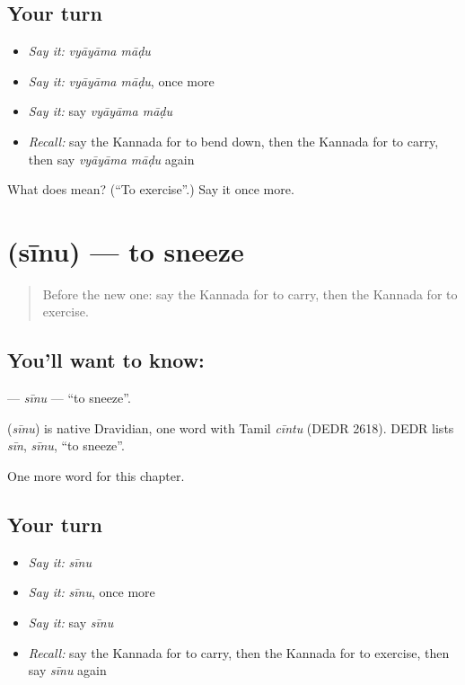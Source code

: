 \subsection*{Your turn}
\begin{itemize}
\raggedright
  \item \emph{Say it:} \emph{vyāyāma māḍu}
  \item \emph{Say it:} \emph{vyāyāma māḍu}, once more
  \item \emph{Say it:} say \emph{vyāyāma māḍu}
  \item \emph{Recall:} say the Kannada for to bend down, then the Kannada for to carry, then say \emph{vyāyāma māḍu} again
\end{itemize}

\begin{tcolorbox}[breakable,colback=teal!4,colframe=teal!35!black,title={Before you move on}]
What does   mean? (\textquotedblleft{}To exercise\textquotedblright{}.) Say it once more.
\end{tcolorbox}
\section[\texorpdfstring{\kn{ಸೀನು} (sīnu)}{ಸೀನು (sīnu)}]{ (sīnu) — to sneeze}

\label{lesson:KA-C160-sinu}



\begin{quote}
Before the new one: say the Kannada for to carry, then the Kannada for to exercise.
\end{quote}

\subsection*{You'll want to know: }
\textbf{} — \emph{sīnu} — \textquotedblleft{}to sneeze\textquotedblright{}.

\begin{cousinweb}
\textbf{} (\emph{sīnu}) is native Dravidian, one word with Tamil \emph{cīntu} (DEDR 2618). DEDR lists \emph{sīn}, \emph{sīnu}, \textquotedblleft{}to sneeze\textquotedblright{}.
\end{cousinweb}

\begin{grammarlens}[title={What you've built}]
One more word for this chapter.
\end{grammarlens}

\subsection*{Your turn}
\begin{itemize}
\raggedright
  \item \emph{Say it:} \emph{sīnu}
  \item \emph{Say it:} \emph{sīnu}, once more
  \item \emph{Say it:} say \emph{sīnu}
  \item \emph{Recall:} say the Kannada for to carry, then the Kannada for to exercise, then say \emph{sīnu} again
\end{itemize}


